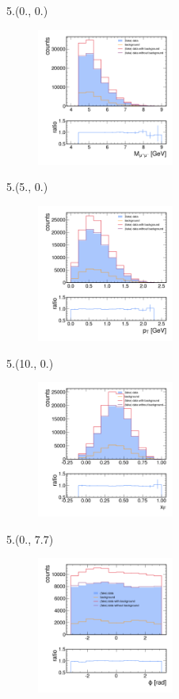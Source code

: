 \documentclass[10pt, xcolor={dvipsnames}, sans, mathserif, aspectratio=169]{beamer}
\newenvironment{Pic}[2]
{\begin{textblock}{#1}#2
\begin{figure}}
{\end{figure}
\end{textblock}}
\begin{document}
\begin{frame}

\begin{Pic}{5.}{(0., 0.)}
	\includegraphics[width=4.5cm]{bs_mass.png}
\end{Pic}

\begin{Pic}{5.}{(5., 0.)}
	\includegraphics[width=4.5cm]{bs_pT.png}
\end{Pic}

\begin{Pic}{5.}{(10., 0.)}
	\includegraphics[width=4.5cm]{bs_xF.png}
\end{Pic}

\begin{Pic}{5.}{(0., 7.7)}
	\includegraphics[width=4.5cm]{bs_phi.png}
\end{Pic}


\end{frame}
\end{document}
